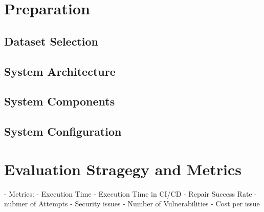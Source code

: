 \section{Preparation}
\subsection{Dataset Selection}
\subsection{System Architecture}
\subsection{System Components}
\subsection{System Configuration}

\section{Evaluation Stragegy and Metrics}
- Metrics:
- Execution Time
- Execution Time in CI/CD
- Repair Success Rate
- nubmer of Attempts
- Security issues
- Number of Vulnerabilities
- Cost per issue

